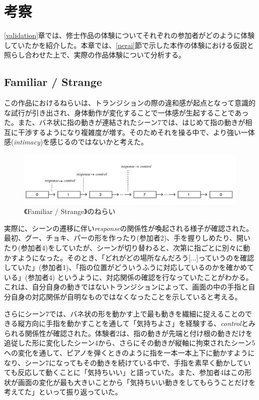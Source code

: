 \chapter{考察}
\label{考察}
\ref{validation}章では、修士作品の体験についてそれぞれの参加者がどのように体験していたかを紹介した。本章では、\ref{nerai}節で示した本作の体験における仮説と照らし合わせた上で、実際の作品体験について分析する。

\section{Familiar / Strange}
この作品におけるねらいは、トランジションの際の違和感が起点となって意識的な試行が引き出され、身体動作が変化することで一体感が生起することであった。また、バネ状に指の動きが連結されたシーン7では、はじめて指の動きが相互に干渉するようになり複雑度が増す。そのためそれを操る中で、より強い一体感(\textit{intimacy})を感じるのではないかと考えた。

\begin{figure}[H]
  \centering
  \includegraphics[width=15cm]{img/nerai_fs.png}
  \caption{《Familiar / Strange》のねらい}
  \label{fig:nerai_fs_in_discussion}
\end{figure}

実際に、シーンの遷移に伴い\textit{response}の関係性が喚起される様子が確認された。
最初、グー、チョキ、パーの形を作ったり(参加者2)、手を握りしめたり、開いたり(参加者4)をしていたが、シーンが切り替わると、次第に指ごとに別々に動かすようになった。そのとき、「どれがどの場所なんだろう[...]っていうのを確認していた」(参加者1)、「指の位置がどういうふうに対応しているのかを確かめている」(参加者4)
というように、対応関係の確認を行なっていたことがわかる。これは、自分自身の動きではないトランジションによって、画面の中の手指と自分自身の対応関係が自明なものではなくなったことを示していると考える。

さらにシーン7では、バネ状の形を動かす上で最も動きを繊細に捉えることのできる縦方向に手指を動かすことを通して「気持ちよさ」を経験する、\textit{control}とみられる関係性が確認された。体験者2は、指の動きが先端と付け根の動きだけを追従した形に変化したシーン4から、さらにその動きが縦軸に拘束されたシーン5への変化を通して、ピアノを弾くときのように指を一本一本上下に動かすようになり、シーン7になってもその動きを続けている中で、手指を素早く動かしていても反応して動くことに「気持ちいい」と語っていた。また、参加者4はこの形状が画面の変化が最も大きいことから「気持ちいい動きをしてもらうことだけを考えてた」といって振り返っていた。

